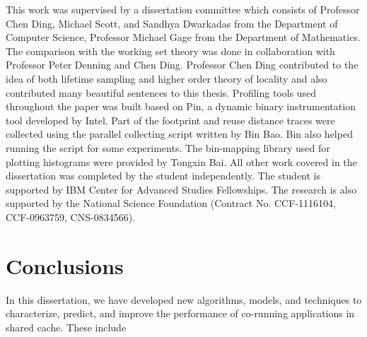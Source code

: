 \documentclass[12pt]{report}
\begin{document}
\begin{contributors}
This work was supervised by a dissertation committee which consists of
Professor Chen Ding, Michael Scott, and Sandhya Dwarkadas from the
Department of Computer Science, Professor Michael Gage from the
Department of Mathematics. The comparison with the working set theory
was done in collaboration with Professor Peter Denning and Chen
Ding. Professor Chen Ding contributed to the idea of both lifetime
sampling and higher order theory of locality and also contributed many
beautiful sentences to this thesis.  Profiling tools used
throughout the paper was built based on Pin, a dynamic binary
instrumentation tool developed by Intel. Part of the footprint and
reuse distance traces were collected using the parallel collecting
script written by Bin Bao. Bin also helped running the script for some
experiments. The bin-mapping library used for plotting histograms were
provided by Tongxin Bai. All other work covered in the dissertation
was completed by the student independently. The student is supported
by IBM Center for Advanced Studies Fellowships. The research is also
supported by the National Science Foundation (Contract No. CCF-1116104,
CCF-0963759, CNS-0834566). 
\end{contributors}

\tableofcontents

\listoftables

\listoffigures








\chapter{Conclusions}
\label{chap:summary}
In this dissertation, we have developed new algorithms, models, and
techniques to characterize, predict, and improve the performance of
co-running applications in shared cache.  These include

\end{document}
